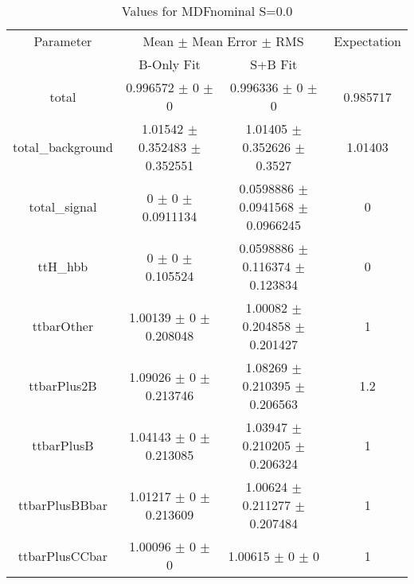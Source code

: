 \begin{table}
\centering
\caption{Values for MDFnominal S=0.0}
\begin{tabular}{cccc}
\toprule
Parameter & \multicolumn{2}{c}{Mean $\pm$ Mean Error $\pm$ RMS} & Expectation\\
 & B-Only Fit & S+B Fit & \\
\midrule
total & \num{0.996572} $\pm$ \num{0} $\pm$ \num{0} & \num{0.996336} $\pm$ \num{0} $\pm$ \num{0} & \num{0.985717}\\
total\_background & \num{1.01542} $\pm$ \num{0.352483} $\pm$ \num{0.352551} & \num{1.01405} $\pm$ \num{0.352626} $\pm$ \num{0.3527} & \num{1.01403}\\
total\_signal & \num{0} $\pm$ \num{0} $\pm$ \num{0.0911134} & \num{0.0598886} $\pm$ \num{0.0941568} $\pm$ \num{0.0966245} & \num{0}\\
ttH\_hbb & \num{0} $\pm$ \num{0} $\pm$ \num{0.105524} & \num{0.0598886} $\pm$ \num{0.116374} $\pm$ \num{0.123834} & \num{0}\\
ttbarOther & \num{1.00139} $\pm$ \num{0} $\pm$ \num{0.208048} & \num{1.00082} $\pm$ \num{0.204858} $\pm$ \num{0.201427} & \num{1}\\
ttbarPlus2B & \num{1.09026} $\pm$ \num{0} $\pm$ \num{0.213746} & \num{1.08269} $\pm$ \num{0.210395} $\pm$ \num{0.206563} & \num{1.2}\\
ttbarPlusB & \num{1.04143} $\pm$ \num{0} $\pm$ \num{0.213085} & \num{1.03947} $\pm$ \num{0.210205} $\pm$ \num{0.206324} & \num{1}\\
ttbarPlusBBbar & \num{1.01217} $\pm$ \num{0} $\pm$ \num{0.213609} & \num{1.00624} $\pm$ \num{0.211277} $\pm$ \num{0.207484} & \num{1}\\
ttbarPlusCCbar & \num{1.00096} $\pm$ \num{0} $\pm$ \num{0} & \num{1.00615} $\pm$ \num{0} $\pm$ \num{0} & \num{1}\\
\bottomrule
\end{tabular}
\end{table}